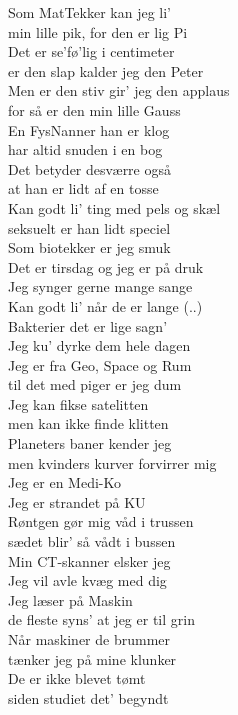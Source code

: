 Som MatTekker kan jeg li’\\
min lille pik, for den er lig Pi\\
Det er se’fø’lig i centimeter\\
er den slap kalder jeg den Peter\\
Men er den stiv gir’ jeg den applaus\\
for så er den min lille Gauss\\

En FysNanner han er klog\\
har altid snuden i en bog\\
Det betyder desværre også\\
at han er lidt af en tosse\\
Kan godt li’ ting med pels og skæl\\
seksuelt er han lidt speciel\\

Som biotekker er jeg smuk\\
Det er tirsdag og jeg er på druk\\
Jeg synger gerne mange sange\\
Kan godt li’ når de er lange (..)\\
Bakterier det er lige sagn’\\
Jeg ku’ dyrke dem hele dagen\\

Jeg er fra Geo, Space og Rum\\
til det med piger er jeg dum\\
Jeg kan fikse satelitten\\
men kan ikke finde klitten\\
Planeters baner kender jeg\\
men kvinders kurver forvirrer mig\\

Jeg er en Medi-Ko\\
Jeg er strandet på KU\\
Røntgen gør mig våd i trussen\\
sædet blir’ så vådt i bussen\\
Min CT-skanner elsker jeg\\
Jeg vil avle kvæg med dig\\

Jeg læser på Maskin\\
de fleste syns’ at jeg er til grin\\
Når maskiner de brummer\\
tænker jeg på mine klunker\\
De er ikke blevet tømt\\
siden studiet det’ begyndt\\

